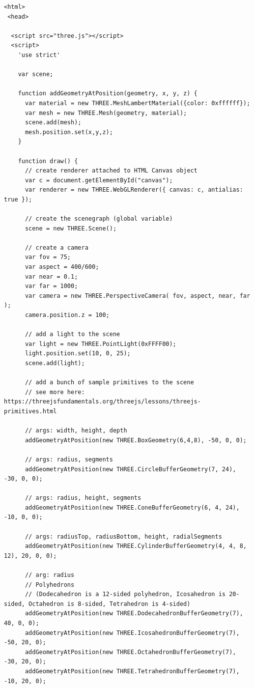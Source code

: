 \documentclass[a4paper,11pt]{article}
\newenvironment{code}{\captionsetup{type=listing}}{}
\begin{document}
\begin{code}
\begin{verbatim}
<html>
 <head>
  
  <script src="three.js"></script>
  <script>
    'use strict'

    var scene;

    function addGeometryAtPosition(geometry, x, y, z) {
      var material = new THREE.MeshLambertMaterial({color: 0xffffff});
      var mesh = new THREE.Mesh(geometry, material);
      scene.add(mesh);
      mesh.position.set(x,y,z);
    }

    function draw() {
      // create renderer attached to HTML Canvas object
      var c = document.getElementById("canvas");
      var renderer = new THREE.WebGLRenderer({ canvas: c, antialias: true });

      // create the scenegraph (global variable)
      scene = new THREE.Scene();

      // create a camera
      var fov = 75;
      var aspect = 400/600;
      var near = 0.1;
      var far = 1000;
      var camera = new THREE.PerspectiveCamera( fov, aspect, near, far );
      camera.position.z = 100;

      // add a light to the scene
      var light = new THREE.PointLight(0xFFFF00);
      light.position.set(10, 0, 25);
      scene.add(light);

      // add a bunch of sample primitives to the scene
      // see more here:  https://threejsfundamentals.org/threejs/lessons/threejs-primitives.html 

      // args: width, height, depth
      addGeometryAtPosition(new THREE.BoxGeometry(6,4,8), -50, 0, 0);

      // args: radius, segments
      addGeometryAtPosition(new THREE.CircleBufferGeometry(7, 24), -30, 0, 0);

      // args: radius, height, segments
      addGeometryAtPosition(new THREE.ConeBufferGeometry(6, 4, 24), -10, 0, 0);

      // args: radiusTop, radiusBottom, height, radialSegments
      addGeometryAtPosition(new THREE.CylinderBufferGeometry(4, 4, 8, 12), 20, 0, 0);

      // arg: radius 
      // Polyhedrons
      // (Dodecahedron is a 12-sided polyhedron, Icosahedron is 20-sided, Octahedron is 8-sided, Tetrahedron is 4-sided)
      addGeometryAtPosition(new THREE.DodecahedronBufferGeometry(7), 40, 0, 0);
      addGeometryAtPosition(new THREE.IcosahedronBufferGeometry(7), -50, 20, 0);
      addGeometryAtPosition(new THREE.OctahedronBufferGeometry(7), -30, 20, 0);
      addGeometryAtPosition(new THREE.TetrahedronBufferGeometry(7), -10, 20, 0);


\end{verbatim}
\end{code}
\end{document}
